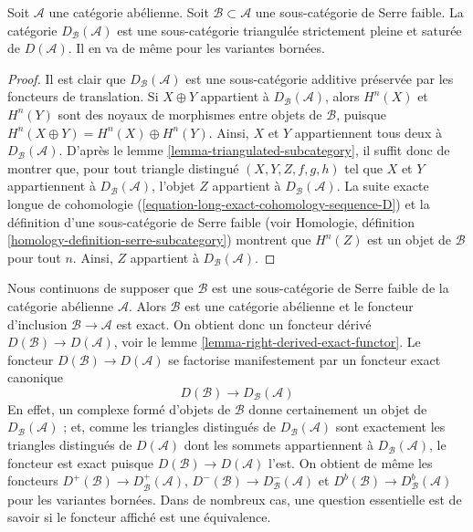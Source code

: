 \begin{lemma}
\label{lemma-cohomology-in-serre-subcategory}
Soit $\mathcal{A}$ une catégorie abélienne. Soit
$\mathcal{B} \subset \mathcal{A}$ une sous-catégorie de Serre faible. La
catégorie $D_\mathcal{B}(\mathcal{A})$ est une sous-catégorie triangulée
strictement pleine et saturée de $D(\mathcal{A})$. Il en va de même pour les
variantes bornées.
\end{lemma}

\begin{proof}
Il est clair que $D_\mathcal{B}(\mathcal{A})$ est une sous-catégorie additive
préservée par les foncteurs de translation. Si $X \oplus Y$ appartient à
$D_\mathcal{B}(\mathcal{A})$, alors $H^n(X)$ et $H^n(Y)$ sont des noyaux de
morphismes entre objets de $\mathcal{B}$, puisque
$H^n(X \oplus Y) = H^n(X) \oplus H^n(Y)$. Ainsi, $X$ et $Y$ appartiennent
tous deux à $D_\mathcal{B}(\mathcal{A})$. D'après le
lemme \ref{lemma-triangulated-subcategory}, il suffit donc de montrer que, pour
tout triangle distingué $(X, Y, Z, f, g, h)$ tel que $X$ et $Y$ appartiennent
à $D_\mathcal{B}(\mathcal{A})$, l'objet $Z$ appartient à
$D_\mathcal{B}(\mathcal{A})$. La suite exacte longue de cohomologie
(\ref{equation-long-exact-cohomology-sequence-D}) et la définition d'une
sous-catégorie de Serre faible (voir Homologie, définition
\ref{homology-definition-serre-subcategory}) montrent que $H^n(Z)$ est un
objet de $\mathcal{B}$ pour tout $n$. Ainsi, $Z$ appartient à
$D_\mathcal{B}(\mathcal{A})$.
\end{proof}

\noindent
Nous continuons de supposer que $\mathcal{B}$ est une sous-catégorie de Serre
faible de la catégorie abélienne $\mathcal{A}$. Alors $\mathcal{B}$ est une
catégorie abélienne et le foncteur d'inclusion
$\mathcal{B} \to \mathcal{A}$ est exact. On obtient donc un foncteur dérivé
$D(\mathcal{B}) \to D(\mathcal{A})$, voir le
lemme \ref{lemma-right-derived-exact-functor}. Le foncteur
$D(\mathcal{B}) \to D(\mathcal{A})$ se factorise manifestement par un foncteur
exact canonique
\begin{equation}
\label{equation-compare}
D(\mathcal{B}) \longrightarrow D_\mathcal{B}(\mathcal{A})
\end{equation}
En effet, un complexe formé d'objets de $\mathcal{B}$ donne certainement un
objet de $D_\mathcal{B}(\mathcal{A})$ ; et, comme les triangles distingués de
$D_\mathcal{B}(\mathcal{A})$ sont exactement les triangles distingués de
$D(\mathcal{A})$ dont les sommets appartiennent à
$D_\mathcal{B}(\mathcal{A})$, le foncteur est exact puisque
$D(\mathcal{B}) \to D(\mathcal{A})$ l'est. On obtient de même les foncteurs
$D^+(\mathcal{B}) \to D^+_\mathcal{B}(\mathcal{A})$,
$D^-(\mathcal{B}) \to D^-_\mathcal{B}(\mathcal{A})$ et
$D^b(\mathcal{B}) \to D^b_\mathcal{B}(\mathcal{A})$ pour les variantes
bornées. Dans de nombreux cas, une question essentielle est de savoir si le
foncteur affiché est une équivalence.

